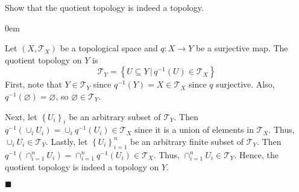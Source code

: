 \documentclass[12pt]{article}
\renewcommand{\qed}{\hfill$\blacksquare$}
\renewenvironment{proof}{\begin{addmargin}[1em]{0em}\begin{newproof}}{\end{newproof}\end{addmargin}\qed}
\newenvironment{exercise}[2][Exercise]{\begin{trivlist}
\item[\hskip \labelsep {\bfseries #1}\hskip \labelsep {\bfseries #2.}]}{\end{trivlist}}
\begin{document}
\begin{exercise}{3.46}
Show that the quotient topology is indeed a topology.
\end{exercise}
\begin{proof}
Let $\left(X,\mathcal{T}_X\right)$ be a topological space and $q: X \rightarrow Y$ be a surjective map. The quotient topology on $Y$ is $$ \mathcal{T}_Y = \left\{ U\subseteq Y \, | \, q^{-1}\left(U\right) \in \mathcal{T}_X\right\} $$ First, note that $Y \in \mathcal{T}_Y$ since $q^{-1}\left(Y\right) = X \in \mathcal{T}_X$ since $q$ surjective. Also, $q^{-1}\left(\varnothing\right) = \varnothing$, so $\varnothing \in \mathcal{T}_Y$.

Next, let $\left\{U_i\right\}_i$ be an arbitrary subset of $\mathcal{T}_Y$. Then $q^{-1}\left(\cup_i U_i\right) = \cup_i q^{-1}\left(U_i\right) \in \mathcal{T}_X$ since it is a union of elements in $\mathcal{T}_X$. Thus, $\cup_i U_i \in \mathcal{T}_Y$. Lastly, let $\left\{U_i\right\}_{i=1}^n$ be an arbitrary finite subset of $\mathcal{T}_Y$. Then $q^{-1}\left(\cap_{i=1}^n U_i\right) = \cap_{i=1}^n q^{-1}\left(U_i\right)\in \mathcal{T}_X$. Thus, $\cap_{i=1}^n U_i \in \mathcal{T}_Y$. Hence, the quotient topology is indeed a topology on $Y$.
\end{proof}
\end{document}
